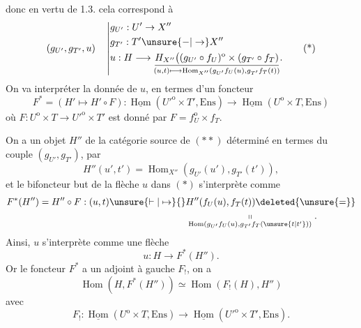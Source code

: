 donc en vertu de 1.3. cela correspond à
\[
\begin{aligned}
(g_{U'},g_{T'},u)\quad\left|\begin{aligned}
&g_{U'}:U'\to X''\\
&g_{T'}:T'\unsure{-|\to}X''\\
&u:H\longrightarrow
\underset{\scriptstyle (u,t)\longmapsto\operatorname{Hom}_{X''}(g_{U'}f_U(u),g_{T'}f_T(t))}
{\underline{H_{X''}\bigl((g_{U'}\circ f_U)^{\mathrm o}\times(g_{T'}\circ f_T)}} .
\end{aligned}\right.
\end{aligned}\tag*{(*)}
\]
On va interpréter la donnée de $u$, en termes d'un
foncteur
\[
F^*=(H'\mapsto H'\circ F):
\underline{\operatorname{Hom}}({U'}^{\mathrm o}\times T',\mathrm{Ens})\to
\underline{\operatorname{Hom}}(U^{\mathrm o}\times T,\mathrm{Ens})\tag*{(**)}
\]
où $F:U^{\mathrm o}\times T\longrightarrow {U'}^{\mathrm o}\times T'$ est donné par $F=f_U^{\mathrm o}\times f_T$.

On a un objet $H''$  de la catégorie source de $(**)$
déterminé  en termes du couple $(g_{U'},g_{T'})$, par
\[
H''(u',t')=\operatorname{Hom}_{X''}(g_{U'}(u'),g_{T'}(t')),
\]
et le bifoncteur but de la flèche $u$ dans $(*)$ s'interprète comme
\[
\begin{aligned}
F^*(H'')=H''\circ F:(u,t)\unsure{\vdash|\mapsto}{}&
 H''(f_U(u),f_T(t))\deleted{\unsure{=}}\\
&\underset{\operatorname{Hom}(g_{U'}f_U(u),g_{T'}f_T(\unsure{t|t'}))}{\shortparallel}.
\end{aligned}
\]
Ainsi, $u$ s'interprète comme une flèche
\[
u:H\longrightarrow F^*(H'').
\]
Or le foncteur $F^*$ a un adjoint à gauche
$F_!$,  on a
\[
\operatorname{Hom}(H,F^*(H''))\simeq\operatorname{Hom}(F_!(H),H'')\tag*{(***)}
\]
avec
\[
F_!:\underline{\operatorname{Hom}}(U^{\mathrm o}\times T,\mathrm{Ens})\longrightarrow
\underline{\operatorname{Hom}}({U'}^{\mathrm o}\times T',\mathrm{Ens}).
\]

